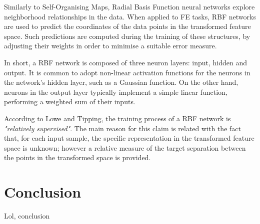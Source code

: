 \documentclass[9pt,journal,compsoc]{IEEEtran}
\begin{document}
Similarly to Self-Organising Maps, Radial Basis Function neural networks explore neighborhood relationships in the data. When applied to FE tasks, RBF networks are used to predict the coordinates of the data points in the transformed feature space. Such predictions are computed during the training of these structures, by adjusting their weights in order to minimise a suitable error measure.

In short, a RBF network is composed of three neuron layers: input, hidden and output. It is common to adopt non-linear activation functions for the neurons in the network's hidden layer, such as a Gaussian function. On the other hand, neurons in the output layer typically implement a simple linear function, performing a weighted sum of their inputs.

According to Lowe and Tipping\cite{lowe1997neuroscale}, the training process of a RBF network is \emph{"relatively supervised"}. The main reason for this claim is related with the fact that, for each input sample, the specific representation in the transformed feature space is unknown; however a relative measure of the target separation between the points in the transformed space is provided.

\section{Conclusion}\label{sec:conclusion}

Lol, conclusion



\end{document}
